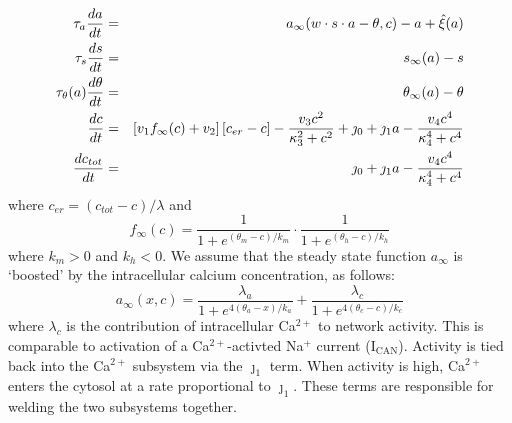 \documentclass[12pt]{article}
\def\ca{Ca$^{2+}$\xspace}
\def\w{w}
\def\taus{\tau_s}
\def\thetaa{\theta_a}
\def\ka{k_a}
\def\ainf{a_\infty}
\def\sinf{s_\infty}
\def\thetac{\theta_c}
\def\kc{k_c}
\def\thetainf{\theta_\infty}
\def\tautheta{\tau_\theta}
\def\ctot{c_{tot}}
\def\cer{c_{er}}
\def\finf{f_\infty}
\def\thetam{\theta_m}
\def\km{k_m}
\def\thetah{\theta_h}
\def\kh{k_h}
\begin{document}
\begin{eqnarray*}
\tau_a \ddt{a} &=& \ainf (\w \cdot s \cdot a -\theta , c) - a + \hat{\xi}(a) \label{ODEACALCIUM} \\
\taus \ddt{s} &=& \sinf (a) - s  \label{ODESCALCIUM} \\
\tautheta(a) \ddt{\theta} &=& \thetainf (a) - \theta   \label{ODETHETACALCIUM}  \\
  \ddt{c} &=&  \left[ v_1 \finf(c) + v_2 \right] [\cer - c ] - \frac{v_3 c^2 }{\kappa_3^2 + c^2} + \jmath_0 + \jmath_1 a   -  \frac{v_4 c^4}{\kappa_4^4+c^4}  \label{ODESCALCIUM} \\
 \ddt{\ctot} &=& \jmath_0 + \jmath_1 a -   \frac{v_4 c^4}{\kappa_4^4+c^4}   \label{ODESCALCIUM}  \label{ODESCAER}
\end{eqnarray*}
where  $\cer = (\ctot-c)/\lambda$ and 
\begin{equation}
\finf(c) =  \frac{1}{1+e^{(\thetam-c)/\km}} \cdot  \frac{1}{1+e^{(\thetah-c)/\kh}}  \nonumber 
\end{equation}
where $\km>0$ and $\kh<0$.  We assume that the 
steady state function $\ainf$ is `boosted' by the intracellular calcium concentration, as follows:
\begin{equation}
\ainf(x,c) = \frac{\lambda_a }{1+e^{4(\thetaa-x)/\ka}}  + \frac{\lambda_c }{1+e^{4(\thetac-c)/\kc}}  
 \nonumber 
\end{equation}
where $\lambda_c$ is the contribution of intracellular \ca to network activity. This is comparable to activation of a \ca-activted Na$^+$ current (I$_{\text{CAN}}$). Activity is tied back into the \ca subsystem via the $\jmath_1$ term. When activity is high, \ca enters the cytosol at a rate proportional to $\jmath_1$. These terms are responsible for welding the two subsystems together. 
\end{document}
